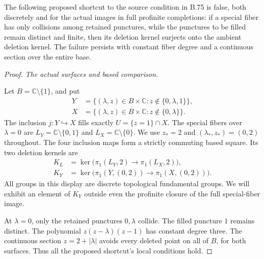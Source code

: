 The following proposed shortcut to the source condition in B.75 is
false, both discretely and for the actual images in full profinite
completions: if a special fiber has only collisions among retained
punctures, while the punctures to be filled remain distinct and finite,
then its deletion kernel surjects onto the ambient deletion kernel.
The failure persists with constant fiber degree and a continuous
section over the entire base.

\begin{proof}
\emph{The actual surfaces and based comparison.}\par
Let \(B=\mathbb C\setminus\{1\}\), and put
\[
\begin{aligned}
 Y&=\{(\lambda,z)\in B\times\mathbb C:
                       z\notin\{0,\lambda,1\}\},\\
 X&=\{(\lambda,z)\in B\times\mathbb C:
                       z\notin\{0,\lambda\}\}.
\end{aligned}
 \tag{B.76.1}
\]
The inclusion \(j:Y\hookrightarrow X\) fills exactly
\(U=\{z=1\}\cap X\). The special fibers over \(\lambda=0\)
are \(L_Y=\mathbb C\setminus\{0,1\}\) and
\(L_X=\mathbb C\setminus\{0\}\). We use \(z_*=2\) and
\((\lambda_*,z_*)=(0,2)\) throughout. The four inclusion maps
form a strictly commuting based square. Its two deletion kernels are
\[
\begin{aligned}
 K_L&=\ker\bigl(\pi_1(L_Y,2)\longrightarrow\pi_1(L_X,2)\bigr),\\
 K_Y&=\ker\bigl(\pi_1(Y,(0,2))\longrightarrow
                         \pi_1(X,(0,2))\bigr).
\end{aligned}
 \tag{B.76.2}
\]
All groups in this display are discrete topological fundamental
groups. We will exhibit an element of \(K_Y\) outside even the
profinite closure of the full special-fiber image.

At \(\lambda=0\), only the retained punctures \(0,\lambda\)
collide. The filled puncture \(1\) remains distinct. The polynomial
\(z(z-\lambda)(z-1)\) has constant degree three. The continuous
section \(z=2+|\lambda|\) avoids every deleted point on all of
\(B\), for both surfaces. Thus all the proposed shortcut's local
conditions hold.


\end{proof}
